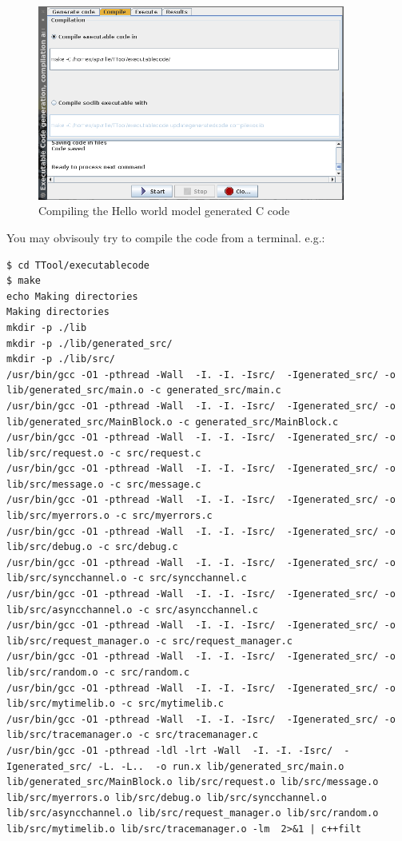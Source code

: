 \documentclass[12pt]{article}
\begin{document}
\begin{figure}[htbp]
\centering
\includegraphics[width=0.9\textwidth]{figures/compilehelloworld}
\caption{Compiling the Hello world model generated C code} \label{fig:compilehelloworld}
\end{figure}

You may obvisouly try to compile the code from a terminal. e.g.:
\begin{lstlisting}
$ cd TTool/executablecode
$ make
echo Making directories
Making directories
mkdir -p ./lib
mkdir -p ./lib/generated_src/
mkdir -p ./lib/src/ 
/usr/bin/gcc -O1 -pthread -Wall  -I. -I. -Isrc/  -Igenerated_src/ -o lib/generated_src/main.o -c generated_src/main.c
/usr/bin/gcc -O1 -pthread -Wall  -I. -I. -Isrc/  -Igenerated_src/ -o lib/generated_src/MainBlock.o -c generated_src/MainBlock.c
/usr/bin/gcc -O1 -pthread -Wall  -I. -I. -Isrc/  -Igenerated_src/ -o lib/src/request.o -c src/request.c
/usr/bin/gcc -O1 -pthread -Wall  -I. -I. -Isrc/  -Igenerated_src/ -o lib/src/message.o -c src/message.c
/usr/bin/gcc -O1 -pthread -Wall  -I. -I. -Isrc/  -Igenerated_src/ -o lib/src/myerrors.o -c src/myerrors.c
/usr/bin/gcc -O1 -pthread -Wall  -I. -I. -Isrc/  -Igenerated_src/ -o lib/src/debug.o -c src/debug.c
/usr/bin/gcc -O1 -pthread -Wall  -I. -I. -Isrc/  -Igenerated_src/ -o lib/src/syncchannel.o -c src/syncchannel.c
/usr/bin/gcc -O1 -pthread -Wall  -I. -I. -Isrc/  -Igenerated_src/ -o lib/src/asyncchannel.o -c src/asyncchannel.c
/usr/bin/gcc -O1 -pthread -Wall  -I. -I. -Isrc/  -Igenerated_src/ -o lib/src/request_manager.o -c src/request_manager.c
/usr/bin/gcc -O1 -pthread -Wall  -I. -I. -Isrc/  -Igenerated_src/ -o lib/src/random.o -c src/random.c
/usr/bin/gcc -O1 -pthread -Wall  -I. -I. -Isrc/  -Igenerated_src/ -o lib/src/mytimelib.o -c src/mytimelib.c
/usr/bin/gcc -O1 -pthread -Wall  -I. -I. -Isrc/  -Igenerated_src/ -o lib/src/tracemanager.o -c src/tracemanager.c
/usr/bin/gcc -O1 -pthread -ldl -lrt -Wall  -I. -I. -Isrc/  -Igenerated_src/ -L. -L..  -o run.x lib/generated_src/main.o lib/generated_src/MainBlock.o lib/src/request.o lib/src/message.o lib/src/myerrors.o lib/src/debug.o lib/src/syncchannel.o lib/src/asyncchannel.o lib/src/request_manager.o lib/src/random.o lib/src/mytimelib.o lib/src/tracemanager.o -lm  2>&1 | c++filt
\end{lstlisting}
\end{document}
